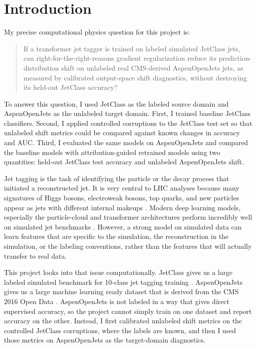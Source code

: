 \documentclass[11pt]{article}
\begin{document}
\section{Introduction}
My precise computational physics question for this project is:
\begin{quote}
If a transformer jet tagger is trained on labeled simulated JetClass jets, can right-for-the-right-reasons gradient regularization reduce its prediction-distribution shift on unlabeled real CMS-derived AspenOpenJets jets, as measured by calibrated output-space shift diagnostics, without destroying its held-out JetClass accuracy?
\end{quote}

To answer this question, I used JetClass as the labeled source domain and AspenOpenJets as the unlabeled target domain. First, I trained baseline JetClass classifiers. Second, I applied controlled corruptions to the JetClass test set so that unlabeled shift metrics could be compared against known changes in accuracy and AUC. Third, I evaluated the same models on AspenOpenJets and compared the baseline models with attribution-guided retrained models using two quantities: held-out JetClass test accuracy and unlabeled AspenOpenJets shift.

Jet tagging is the task of identifying the particle or the decay process that initiated a reconstructed jet. It is very central to LHC analyses because many signatures of Higgs bosons, electroweak bosons, top quarks, and new particles appear as jets with different internal makeups \cite{larkoski2017jet,kogler2019jet}. Modern deep learning models, especially the particle-cloud and transformer architectures perform incredibly well on simulated jet benchmarks \cite{qu2022particle}. However, a strong model on simulated data can learn features that are specific to the simulation, the reconstruction in the simulation, or the labeling conventions, rather than the features that will actually transfer to real data.

This project looks into that issue computationally. JetClass gives us a large labeled simulated benchmark for 10-class jet tagging training \cite{qu2022particle}. AspenOpenJets gives us a large machine learning ready dataset that is derived from the CMS 2016 Open Data \cite{amram2025aspen}. AspenOpenJets is not labeled in a way that gives direct supervised accuracy, so the project cannot simply train on one dataset and report accuracy on the other. Instead, I first calibrated unlabeled shift metrics on the controlled JetClass corruptions, where the labels are known, and then I used those metrics on AspenOpenJets as the target-domain diagnostics.
\end{document}
